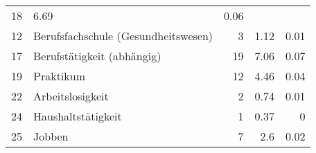 \begin{longtable}{lXrrr}
       \num{18} &
       \num[round-mode=places,round-precision=2]{6,69} &
         \num[round-mode=places,round-precision=2]{0,06} \\

     12 &
     \multicolumn{1}{X}{ Berufsfachschule (Gesundheitswesen)   } &


       \num{3} &
       \num[round-mode=places,round-precision=2]{1,12} &
         \num[round-mode=places,round-precision=2]{0,01} \\

     17 &
     \multicolumn{1}{X}{ Berufstätigkeit (abhängig)   } &


       \num{19} &
       \num[round-mode=places,round-precision=2]{7,06} &
         \num[round-mode=places,round-precision=2]{0,07} \\

     19 &
     \multicolumn{1}{X}{ Praktikum   } &


       \num{12} &
       \num[round-mode=places,round-precision=2]{4,46} &
         \num[round-mode=places,round-precision=2]{0,04} \\

     22 &
     \multicolumn{1}{X}{ Arbeitslosigkeit   } &


       \num{2} &
       \num[round-mode=places,round-precision=2]{0,74} &
         \num[round-mode=places,round-precision=2]{0,01} \\

     24 &
     \multicolumn{1}{X}{ Haushaltstätigkeit   } &


       \num{1} &
       \num[round-mode=places,round-precision=2]{0,37} &
         \num[round-mode=places,round-precision=2]{0} \\

     25 &
     \multicolumn{1}{X}{ Jobben   } &


       \num{7} &
       \num[round-mode=places,round-precision=2]{2,6} &
         \num[round-mode=places,round-precision=2]{0,02} \\


\end{longtable}

